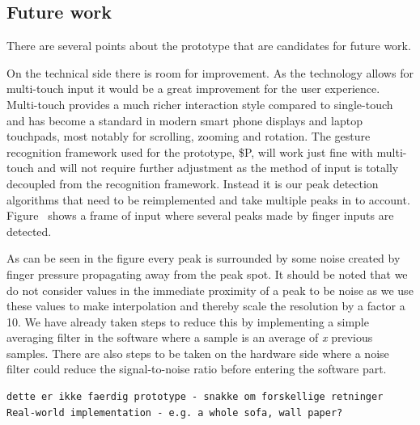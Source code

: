 \subsection{Future work}
\label{ch:textiletouch:futurework}

There are several points about the prototype that are candidates for future work.

On the technical side there is room for improvement.
As the technology allows for multi-touch input it would be a great improvement for the user experience.
Multi-touch provides a much richer interaction style  compared to single-touch and has become a standard in modern smart phone displays and laptop touchpads, most notably for scrolling, zooming and rotation.
The gesture recognition framework used for the prototype, \$P, will work just fine with multi-touch and will not require further adjustment as the method of input is totally decoupled from the recognition framework. 
Instead it is our peak detection algorithms that need to be reimplemented and take multiple peaks in to account.
Figure~ shows a frame of input where several peaks made by finger inputs are detected. 

As can be seen in the figure every peak is surrounded by some noise created by finger pressure propagating away from the peak spot.
It should be noted that we do not consider values in the immediate proximity of a peak to be noise as we use these values to make interpolation and thereby scale the resolution by a factor a 10.
We have already taken steps to reduce this by implementing a simple averaging filter in the software 
where a sample is an average of \emph{x} previous samples.
There are also steps to be taken on the hardware side where a noise filter could reduce the signal-to-noise ratio before entering the software part.


\begin{verbatim}
dette er ikke faerdig prototype - snakke om forskellige retninger
Real-world implementation - e.g. a whole sofa, wall paper?
\end{verbatim}

